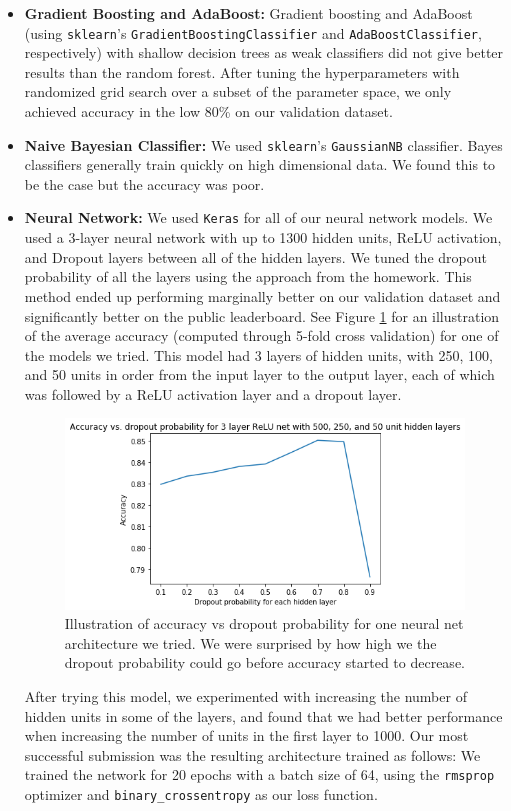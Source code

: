 \begin{itemize}
\begin{itemize}
  \item \textbf{Gradient Boosting and AdaBoost:} Gradient boosting and AdaBoost (using \texttt{sklearn}'s \texttt{GradientBoostingClassifier} and \texttt{AdaBoostClassifier}, respectively) with shallow decision trees as weak classifiers did not give better results than the random forest. After tuning the hyperparameters with randomized grid search over a subset of the parameter space, we only achieved accuracy in the low 80\% on our validation dataset. 
  \item \textbf{Naive Bayesian Classifier:} We used \texttt{sklearn}'s \texttt{GaussianNB} classifier. Bayes classifiers generally train quickly on high dimensional data. We found this to be the case but the accuracy was poor. 
  \item \textbf{Neural Network:} We used \texttt{Keras} for all of our neural network models. We used a 3-layer neural network with up to 1300 hidden units, ReLU activation, and Dropout layers between all of the hidden layers. We tuned the dropout probability of all the layers using the approach from the  homework. This method ended up performing marginally better on our validation dataset and significantly better on the public leaderboard. See Figure \ref{acc_vs_dropout_prob} for an illustration of the average accuracy (computed through 5-fold cross validation) for one of the models we tried. This model had 3 layers of hidden units, with 250, 100, and 50 units in order from the input layer to the output layer, each of which was followed by a ReLU activation layer and a dropout layer. 
    \begin{figure}[h]
      \centering
      \includegraphics[scale=0.7]{accuracy_vs_dropout_prob.png}
      \caption{Illustration of accuracy vs dropout probability for one neural net architecture we tried. We were surprised by how high we the dropout probability could go before accuracy started to decrease.}\label{acc_vs_dropout_prob}
    \end{figure}
    After trying this model, we experimented with increasing the number of hidden units in some of the layers, and found that we had better performance when increasing the number of units in the first layer to 1000. Our most successful submission was the resulting architecture trained as follows: We trained the network for 20 epochs with a batch size of 64, using the \texttt{rmsprop} optimizer and \texttt{binary\_crossentropy} as our loss function. 


\end{itemize}
\end{itemize}

